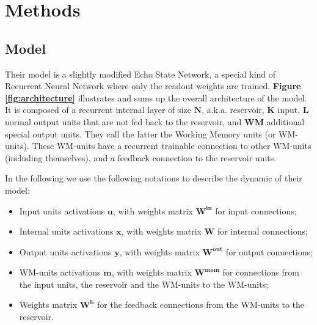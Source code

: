 \section{Methods}
\label{s:method}

\subsection{Model}
\label{s:model}

Their model is a slightly modified Echo State Network, a special kind of Recurrent Neural Network where only the readout weights are trained.
\textbf{Figure \ref{fig:architecture}} illustrates and sums up the overall architecture of the model.
It is composed of a recurrent internal layer of size $\mathbf{N}$, a.k.a. reservoir, $\mathbf{K}$ input, $\mathbf{L}$ normal output units that are not fed back to the reservoir, and $\mathbf{WM}$ additional special output units.
They call the latter the Working Memory units (or WM-units).
These WM-units have a recurrent trainable connection to other WM-units (including themselves), and a feedback connection to the reservoir units.

In the following we use the following notations to describe the dynamic of their model:
\begin{itemize}
    \item Input units activations $\mathbf{u}$, with weights matrix $\mathbf{W^{in}}$ for input connections;
    \item Internal units activations $\mathbf{x}$, with weights matrix $\mathbf{W}$ for internal connections;
    \item Output units activations $\mathbf{y}$, with weights matrix $\mathbf{W^{out}}$ for output connections;
    \item WM-units activations $\mathbf{m}$, with weights matrix $\mathbf{W^{mem}}$ for connections from the input units, the reservoir and the WM-units to the WM-units; 
    \item Weights matrix $\mathbf{W^{b}}$ for the feedback connections from the WM-units to the reservoir. 
\end{itemize}

